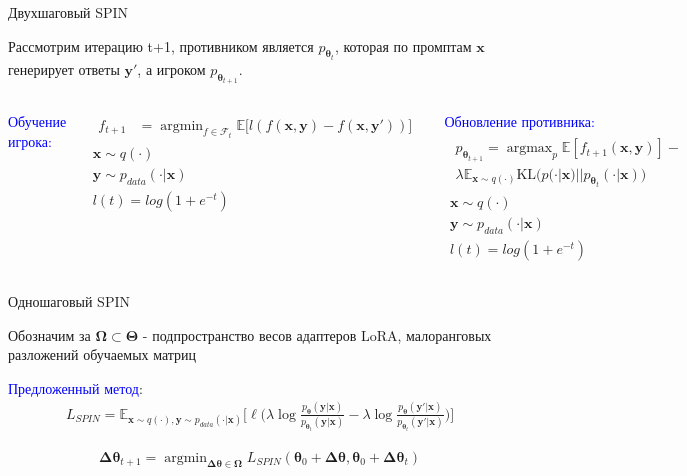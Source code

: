 \documentclass{beamer}
\newcommand{\bx}{\mathbf{x}}
\newcommand{\by}{\mathbf{y}}
\newcommand{\bOmega}{\boldsymbol{\Omega}}
\newcommand{\btheta}{\boldsymbol{\theta}}
\newcommand{\bTheta}{\boldsymbol{\Theta}}
\newcommand{\bDelta}{\boldsymbol{\Delta}}
\newcommand{\cF}{\mathcal{F}}
\newcommand{\EE}{\mathbb{E}}
\newcommand{\argmax}{\mathop{\mathrm{argmax}}}
\newcommand{\argmin}{\mathop{\mathrm{argmin}}}
\begin{document}
\begin{frame}{Двухшаговый SPIN}

\bigskip

Рассмотрим итерацию t+1, противником является $p_{\btheta_t}$, которая по промптам $\bx$ генерирует ответы $\by'$, а игроком $p_{\btheta_{t+1}}$.

\bigskip


\begin{columns}[T]
\textcolor{blue}{Обучение игрока:}

\begin{gather*}
    \begin{align*}
        f_{t+1} &= \argmin_{f \in \cF_{t}}\EE\big[l(f(\bx, \by) - f(\bx, \by')) \big]
    \end{align*} \\
    \bx \sim q(\cdot) \\
    \by \sim p_{data}(\cdot| \bx) \\
    l(t) = log(1 + e^{-t})
\end{gather*}


    

\textcolor{blue}{Обновление противника:}   
\begin{gather*}
  \begin{align*}
    p_{\btheta_{t+1}} = \argmax_ {p}\EE [f_{t+1}(\bx, \by)] -\\ \lambda \EE_{\bx\sim q(\cdot)}\mathrm{KL}\big(p(\cdot|\bx)||p_{\btheta_t}(\cdot|\bx)\big)
\end{align*} \\
  \bx \sim q(\cdot) \\
    \by \sim p_{data}(\cdot| \bx) \\
    l(t) = log(1 + e^{-t})
\end{gather*}
\end{columns}

\end{frame}
\begin{frame}{Одношаговый SPIN }

\bigskip

Обозначим за $\bOmega \subset \bTheta$ - подпространство весов адаптеров LoRA, малоранговых разложений обучаемых матриц

\bigskip

\textcolor{blue}{Предложенный метод}:
\begin{gather*}
 L_{SPIN}= \EE_{\bx\sim q(\cdot), \by\sim p_{data}(\cdot | \bx)}\bigg[\ell\bigg(\lambda \log \frac{p_{\btheta}(\by | \bx)}{p_{\btheta_t}(\by | \bx)}-\lambda \log \frac{p_{\btheta}(\by' | \bx)}{p_{\btheta_t}(\by' | \bx)}\bigg)\bigg]
\end{gather*}

\begin{gather*}
    \bDelta\btheta_{t+1} = \argmin_{\bDelta\btheta \in \bOmega} L_{SPIN} (\btheta_0 + \bDelta\btheta, \btheta_0 + \bDelta \btheta_t)
\end{gather*}

\end{frame}
\end{document}
